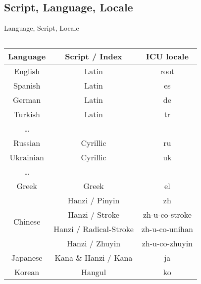 \documentclass[aspectratio=169,10pt]{beamer}
\begin{document}

\subsection{Script, Language, Locale}

\begin{frame}[fragile]{Language, Script, Locale}

\setlength\dashlinedash{0.5pt}
\setlength\dashlinegap{1.0pt}

\begin{columns}
\begin{column}{70mm}
\footnotesize
\begin{center}
\begin{tabular}{ccc}
  Language  & Script / Index             & ICU locale \\\hline\hline
  English   & Latin                      & root           \\
  Spanish   & Latin                      & es             \\
  German    & Latin                      & de             \\
  Turkish   & Latin                      & tr             \\
  \ldots    &                            &                \\\hdashline
  Russian   & Cyrillic                   & ru             \\
  Ukrainian & Cyrillic                   & uk             \\
  \ldots    &                            &                \\\hdashline
  Greek     & Greek                      & el             \\\hline
  \multirow{4}{*}{Chinese}   & Hanzi / Pinyin         & zh             \\
            & Hanzi       / Stroke         & zh-u-co-stroke \\
            & Hanzi       / Radical-Stroke & zh-u-co-unihan \\
            & Hanzi       / Zhuyin         & zh-u-co-zhuyin \\\hdashline
  Japanese  & Kana \& Hanzi / Kana       & ja             \\\hdashline
  Korean    & Hangul                     & ko             \\\hline
\end{tabular}

\end{center}
\end{column}
\end{columns}
\end{frame}
\end{document}
